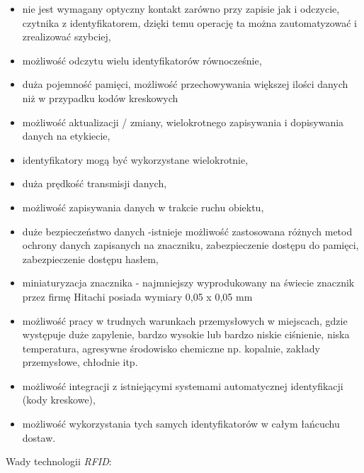 \begin{itemize}\setlength{\itemsep}{0pt}
	\item nie jest wymagany optyczny kontakt zarówno przy zapisie jak i odczycie, czytnika z identyfikatorem, dzięki temu operację ta można zautomatyzować i zrealizować szybciej,
	
	\item możliwość odczytu wielu identyfikatorów równocześnie,
	
	\item duża pojemność pamięci, możliwość przechowywania większej ilości danych niż w przypadku kodów kreskowych

	\item możliwość aktualizacji / zmiany, wielokrotnego zapisywania i dopisywania danych  na etykiecie,

	\item identyfikatory mogą być wykorzystane wielokrotnie,

	\item duża prędkość transmisji danych,

	\item możliwość zapisywania danych w trakcie ruchu obiektu,

	\item duże bezpieczeństwo danych -istnieje możliwość zastosowana różnych metod ochrony danych zapisanych na znaczniku, zabezpieczenie dostępu do pamięci, zabezpieczenie dostępu hasłem,  

	\item miniaturyzacja znacznika - najmniejszy wyprodukowany na świecie znacznik przez firmę Hitachi posiada wymiary 0,05 x 0,05 mm

	\item możliwość pracy w trudnych warunkach przemysłowych w miejscach, gdzie występuje duże zapylenie, bardzo wysokie lub bardzo niskie ciśnienie, niska temperatura, agresywne środowisko chemiczne np. kopalnie, zakłady przemysłowe, chłodnie itp.

	\item możliwość integracji z istniejącymi systemami automatycznej identyfikacji (kody kreskowe),

	\item możliwość wykorzystania tych samych identyfikatorów w całym łańcuchu dostaw.

\end{itemize}

\noindent 
\newline Wady technologii \emph{RFID}:


